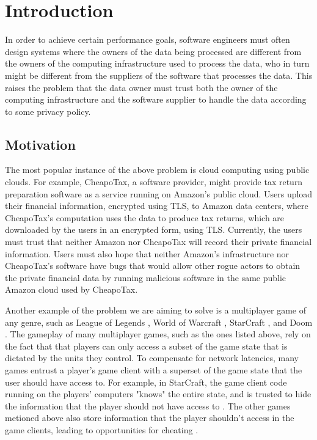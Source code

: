\section{Introduction}
\label{sec:intro}

In order to achieve certain performance goals, software engineers must often
design systems where the owners of the data being processed are different from
the owners of the computing infrastructure used to process the data, who in
turn might be different from the suppliers of the software that processes the
data. This raises the problem that the data owner must trust both the owner
of the computing infrastructure and the software supplier to handle the data
according to some privacy policy.

\subsection{Motivation}
\label{sec:motivation}

The most popular instance of the above problem is cloud computing using public
clouds. For example, CheapoTax, a software provider, might provide tax return
preparation software as a service running on Amazon's public cloud. Users
upload their financial information, encrypted using TLS, to Amazon data
centers, where CheapoTax's computation uses the data to produce tax returns,
which are downloaded by the users in an encrypted form, using TLS. Currently,
the users must trust that neither Amazon nor CheapoTax will record their
private financial information. Users must also hope that neither Amazon's
infrastructure nor CheapoTax's software have bugs that would allow other rogue
actors to obtain the private financial data by running malicious software in
the same public Amazon cloud used by CheapoTax.

Another example of the problem we are aiming to solve is a multiplayer game of
any genre, such as League of Legends \cite{riot2009lol},
World of Warcraft \cite{blizzard2004wow}, StarCraft \cite{blizzard2010sc2}, and
Doom \cite{id2004doom}. The gameplay of many multiplayer games, such as the
ones listed above, rely on the fact that that players can only access a subset
of the game state that is dictated by the units they control. To compensate for
network latencies, many games entrust a player's game client with a superset
of the game state that the user should have access to. For example, in
StarCraft, the game client code running on the players' computers "knows" the
entire state, and is trusted to hide the information that the player should not
have access to \cite{hardy2009cheating}. The other games metioned above also
store information that the player shouldn't access in the game clients, leading
to opportunities for cheating \cite{youtube2013lolcheating}
\cite{youtube2008quake3cheating}.


